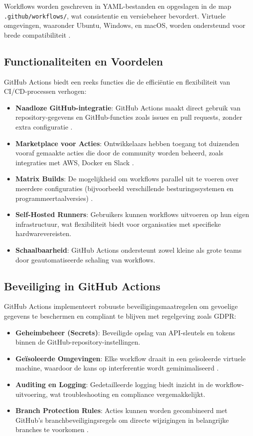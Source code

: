 Workflows worden geschreven in YAML-bestanden en opgeslagen in de map \texttt{.github/workflows/}, wat consistentie en versiebeheer bevordert. Virtuele omgevingen, waaronder Ubuntu, Windows, en macOS, worden ondersteund voor brede compatibiliteit \autocite{kulkarni2022}.

\subsection{Functionaliteiten en Voordelen}

GitHub Actions biedt een reeks functies die de efficiëntie en flexibiliteit van CI/CD-processen verhogen:
\begin{itemize}
    \item \textbf{Naadloze GitHub-integratie}: GitHub Actions maakt direct gebruik van repository-gegevens en GitHub-functies zoals issues en pull requests, zonder extra configuratie \autocite{githubdocs2023actions}.
    \item \textbf{Marketplace voor Acties}: Ontwikkelaars hebben toegang tot duizenden vooraf gemaakte acties die door de community worden beheerd, zoals integraties met AWS, Docker en Slack \autocite{kulkarni2022}.
    \item \textbf{Matrix Builds}: De mogelijkheid om workflows parallel uit te voeren over meerdere configuraties (bijvoorbeeld verschillende besturingssystemen en programmeertaalversies) \autocite{spacelift2023}.
    \item \textbf{Self-Hosted Runners}: Gebruikers kunnen workflows uitvoeren op hun eigen infrastructuur, wat flexibiliteit biedt voor organisaties met specifieke hardwarevereisten.
    \item \textbf{Schaalbaarheid}: GitHub Actions ondersteunt zowel kleine als grote teams door geautomatiseerde schaling van workflows.
\end{itemize}

\subsection{Beveiliging in GitHub Actions}

GitHub Actions implementeert robuuste beveiligingsmaatregelen om gevoelige gegevens te beschermen en compliant te blijven met regelgeving zoals GDPR:
\begin{itemize}
    \item \textbf{Geheimbeheer (Secrets)}: Beveiligde opslag van API-sleutels en tokens binnen de GitHub-repository-instellingen.
    \item \textbf{Geïsoleerde Omgevingen}: Elke workflow draait in een geïsoleerde virtuele machine, waardoor de kans op interferentie wordt geminimaliseerd \autocite{spacelift2023}.
    \item \textbf{Auditing en Logging}: Gedetailleerde logging biedt inzicht in de workflow-uitvoering, wat troubleshooting en compliance vergemakkelijkt.
    \item \textbf{Branch Protection Rules}: Acties kunnen worden gecombineerd met GitHub's branchbeveiligingsregels om directe wijzigingen in belangrijke branches te voorkomen \autocite{kulkarni2022}.
\end{itemize}

